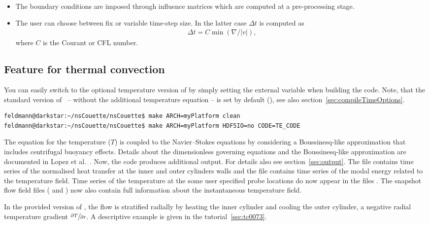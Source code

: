 \documentclass[a4paper, 11pt, DIV=11]{scrartcl}
\begin{document}
\begin{itemize}
\item The boundary conditions are imposed through influence matrices which are 
computed at a pre-processing stage.

\item The user can choose between fix or variable time-step size. In the latter
case $\Delta t$ is computed as
\begin{align}
\Delta t = C \min\left(\nabla / \lvert v\rvert\right)
\text{,}
\end{align}
where $C$ is the Courant or CFL number.

\end{itemize}

\subsection{Feature for thermal convection}
\label{sec:thermalConvection}

You can easily switch to the optional temperature version of \nsc by simply
setting the external variable  when building the code.
Note, that the standard version of \nsc~-- \ie without the additional
temperature equation -- is set by default (), see also
section~\ref{sec:compileTimeOptions}.
\begin{lstlisting}[language=bash]
feldmann@darkstar:~/nsCouette/nsCouette$ make ARCH=myPlatform clean
feldmann@darkstar:~/nsCouette/nsCouette$ make ARCH=myPlatform HDF5IO=no CODE=TE_CODE
\end{lstlisting}
\par
The equation for the temperature ($T$) is coupled to the Navier--Stokes
equations by considering a Boussinesq-like approximation that includes
centrifugal buoyancy effects. Details about the dimensionless governing
equations and the Boussinesq-like approximation are documented in Lopez
et al.~\cite{Lopez2013}. Now, the code produces additional output. For
details also see section~\ref{sec:output}. The file 
contains time series of the normalised heat transfer at the inner and
outer cylinders walls and the file  contains time
series of the modal energy related to the temperature field. Time series
of the temperature at the some user specified probe locations do now
appear in the files . The snapshot flow field files
( and ) now also contain full information
about the instantaneous temperature field.
\par
In the provided version of \nsc, the flow is stratified radially by
heating the inner cylinder and cooling the outer cylinder, \ie a
negative radial temperature gradient $\sfrac{\partial T}{\partial r}$.
A descriptive example is given in the tutorial~\ref{sec:tc0073}.
\end{document}
